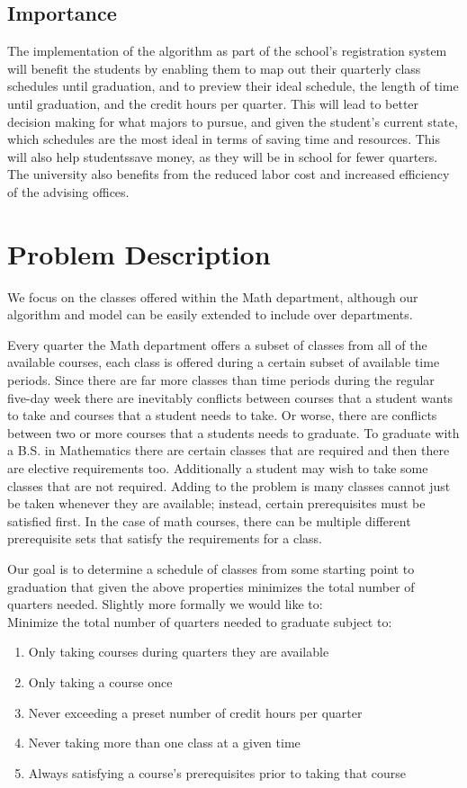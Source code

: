 \documentclass[11pt]{article} %
\begin{document}
\subsection{Importance}
The implementation of the algorithm as part of the school’s registration system will benefit the students by enabling them to map out their quarterly class schedules until graduation, and to preview their ideal schedule, the length of time until graduation, and the credit hours per quarter. This will lead to better decision making for what majors to pursue, and given the student's current state, which schedules are the most ideal in terms of saving time and resources. This will also help studentssave money, as they will be in school for fewer quarters. The university also benefits from the reduced labor cost and increased efficiency of the advising offices.


\section{Problem Description}
We focus on the classes offered within the Math department, although our algorithm and model can be easily extended to include over departments. 

Every quarter the Math department offers a subset of classes from all of the available courses, each class is offered during a certain subset of available time periods. Since there are far more classes than time periods during the regular five-day week there are inevitably conflicts between courses that a student wants to take and courses that a student needs to take. Or worse, there are conflicts between two or more courses that a students needs to graduate. To graduate with a B.S. in Mathematics there are certain classes that are required and then there are elective requirements too. Additionally a student may wish to take some classes that are not required.
Adding to the problem is many classes cannot just be taken whenever they are available; instead, certain prerequisites must be satisfied first. In the case of math courses, there can be multiple different prerequisite sets that satisfy the requirements for a class.

Our goal is to determine a schedule of classes from some starting point to graduation that given the above properties minimizes the total number of quarters needed. Slightly more formally we would like to: \\
Minimize the total number of quarters needed to graduate subject to:
\begin{enumerate}
\item Only taking courses during quarters they are available
\item Only taking a course once
\item Never exceeding a preset number of credit hours per quarter
\item Never taking more than one class at a given time
\item Always satisfying a course's prerequisites prior to taking that course
\end{enumerate}
\end{document}
